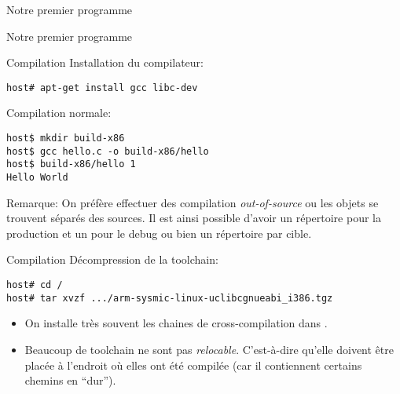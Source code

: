 \begin{frame}[fragile=singleslide]{Notre premier programme}{}
  
\end{frame}

\begin{frame}[fragile=singleslide]{Notre premier programme}{}
  
\end{frame}

\begin{frame}[fragile=singleslide]{Compilation}
  Installation du compilateur:
  \begin{lstlisting}
host# apt-get install gcc libc-dev
  \end{lstlisting}
  Compilation normale:
  \begin{lstlisting}
host$ mkdir build-x86
host$ gcc hello.c -o build-x86/hello
host$ build-x86/hello 1
Hello World
\end{lstlisting} %
Remarque: On préfère effectuer des compilation \emph{out-of-source} ou
les objets  se trouvent  séparés des sources.   Il est  ainsi possible
d'avoir un répertoire  pour la production et un pour  le debug ou bien
un répertoire par cible.
\end{frame}

\begin{frame}[fragile=singleslide]{Compilation}
  Décompression de la toolchain:
  \begin{lstlisting} 
host# cd /
host# tar xvzf .../arm-sysmic-linux-uclibcgnueabi_i386.tgz
  \end{lstlisting}
  \begin{itemize} 
  \item   On  installe  très souvent  les  chaines  de cross-compilation  dans
    . 
  \item      Beaucoup      de      toolchain     ne      sont      pas
    \emph{relocable}.  C'est-à-dire  qu'elle  doivent  être  placée  à
    l'endroit où  elles ont été compilée (car  il contiennent certains
    chemins en ``dur'').
  \end{itemize}
\end{frame}

